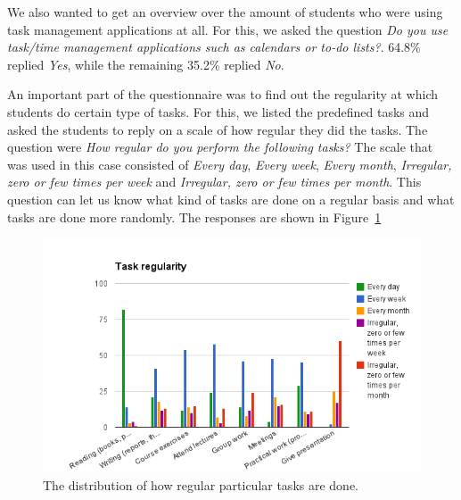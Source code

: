 We also wanted to get an overview over the amount of students who were using task management applications at all. For this, we asked the question \emph{Do you use task/time management applications such as calendars or to-do lists?}. 64.8\% replied \emph{Yes}, while the remaining 35.2\% replied \emph{No}.

An important part of the questionnaire was to find out the regularity at which students do certain type of tasks. For this, we listed the predefined tasks and asked the students to reply on a scale of how regular they did the tasks. The question were \emph{How regular do you perform the following tasks?} The scale that was used in this case consisted of \emph{Every day}, \emph{Every week}, \emph{Every month}, \emph{Irregular, zero or few times per week} and \emph{Irregular, zero or few times per month}. This question can let us know what kind of tasks are done on a regular basis and what tasks are done more randomly. The responses are shown in Figure~\ref{fig:taskregularity}
\begin{figure}[tbp]
  \centering
  \includegraphics[width=\textwidth]{figures/TaskRegularity.png}
  \caption[Student task regularity]{The distribution of how regular particular tasks are done.}
  \label{fig:taskregularity}
\end{figure}

